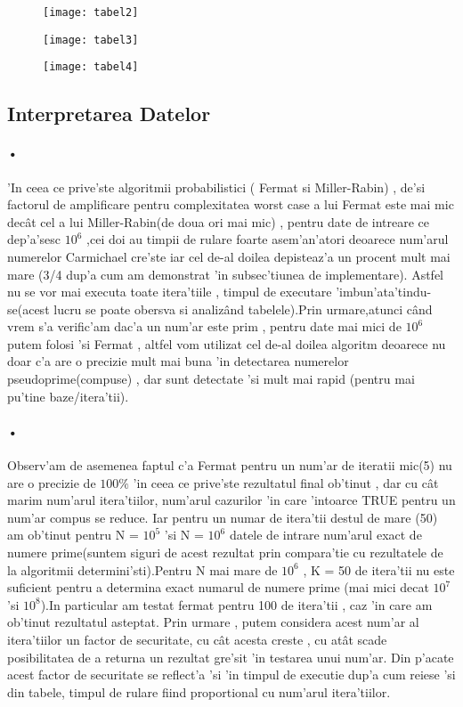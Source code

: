 \documentclass[12pt,twoside]{article}
\numberwithin{figure}{section}
\begin{document}
\begin{figure}
\centering
\texttt{[image: tabel2]}
\caption{}   
\end{figure}

\begin{figure}
\centering
\texttt{[image: tabel3]}
\caption{}   
\end{figure}

\begin{figure}
\centering
\texttt{[image: tabel4]}
\caption{}   
\end{figure}

\newpage
\subsection{Interpretarea Datelor}
\paragraph{•}
'In ceea ce prive'ste algoritmii probabilistici ( Fermat si Miller-Rabin) , de'si factorul de amplificare pentru complexitatea worst case a lui Fermat este mai mic dec\^at cel a lui Miller-Rabin(de doua ori mai mic) , pentru date de intreare ce dep'a'sesc $10^6$ ,cei doi au timpii de rulare foarte asem'an'atori deoarece num'arul numerelor Carmichael cre'ste iar cel de-al doilea depisteaz'a un procent mult mai mare (3/4 dup'a cum am demonstrat 'in subsec'tiunea de implementare). Astfel nu se  vor mai executa toate itera'tiile , timpul de executare 'imbun'ata'tindu-se(acest lucru se poate obersva si analiz\^and tabelele).Prin urmare,atunci c\^and vrem s'a verific'am dac'a un num'ar este prim , pentru date mai mici de $10^6$ putem folosi 'si Fermat , altfel vom utilizat cel de-al doilea algoritm deoarece nu doar c'a are o precizie mult mai buna 'in detectarea numerelor pseudoprime(compuse) , dar sunt detectate 'si mult mai rapid (pentru mai pu'tine baze/itera'tii). 
\paragraph{•}
Observ'am de asemenea faptul c'a Fermat pentru un num'ar de iteratii mic(5) nu are o precizie de $100 \%$ 'in ceea ce prive'ste rezultatul final ob'tinut , dar cu c\^at marim num'arul itera'tiilor, num'arul cazurilor 'in care 'intoarce TRUE pentru un num'ar compus se reduce. Iar pentru un numar de itera'tii destul de mare (50) am ob'tinut pentru N = $10^5$ 'si N = $10^6$ datele de intrare num'arul exact de numere prime(suntem siguri de acest rezultat prin compara'tie cu rezultatele de la algoritmii determini'sti).Pentru N mai mare de $10^6$ , K = 50 de itera'tii nu este suficient pentru a determina exact numarul de numere prime (mai mici decat $10^7$ 'si $10^8$).In particular am testat fermat pentru 100 de itera'tii , caz 'in care am ob'tinut rezultatul asteptat. Prin urmare , putem considera acest num'ar al itera'tiilor un factor de securitate, cu c\^at acesta creste , cu at\^at scade posibilitatea de a returna un rezultat gre'sit 'in testarea unui num'ar. Din p'acate acest factor de securitate se reflect'a 'si 'in timpul de executie dup'a cum reiese 'si din tabele, timpul de rulare fiind proportional cu num'arul itera'tiilor.
\end{document}
